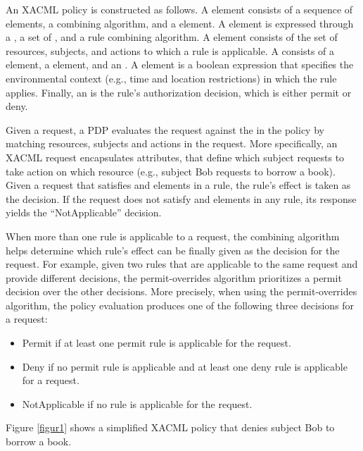 An XACML policy is constructed as follows.
A  element consists of a sequence of  elements, a combining algorithm, and
a  element. A  element is expressed through a , a set of , and a rule combining algorithm. 
A  element consists of the set of resources, subjects, and actions to which a rule is applicable. A  consists of a 
 element, a  element, and an . A  element is a boolean expression that specifies the
environmental context (e.g., time and location restrictions) in which the rule applies.
Finally, an  is the rule's authorization decision, which is either permit or deny.

Given a request, a PDP evaluates the request against the  in the policy by matching resources, subjects and actions in the request.
More specifically, an XACML request encapsulates attributes, that define which subject requests to take action on which resource (e.g., subject Bob requests to borrow a book).
Given a request that satisfies  and  elements in a rule, the rule's effect
is taken as the decision.
If the request does not satisfy  and  elements in any rule, its response yields the ``NotApplicable'' decision.

When more than one rule is applicable to a request, the combining algorithm helps determine which rule's effect can be finally given as the decision for the request.
For example, given two rules that are applicable to the same request and provide different decisions,
the permit-overrides algorithm prioritizes a permit decision over the other decisions.
More precisely, when using the permit-overrides algorithm, the policy evaluation produces one of the following three decisions for a request: 

\begin{itemize}
\item Permit if at least one permit rule is applicable for the request.
\item Deny if no permit rule is applicable and at least one deny rule is applicable for a request.
\item NotApplicable if no rule is applicable for the request.
\end{itemize}

Figure \ref{figur1} shows a simplified XACML policy that denies subject Bob to borrow a book.

